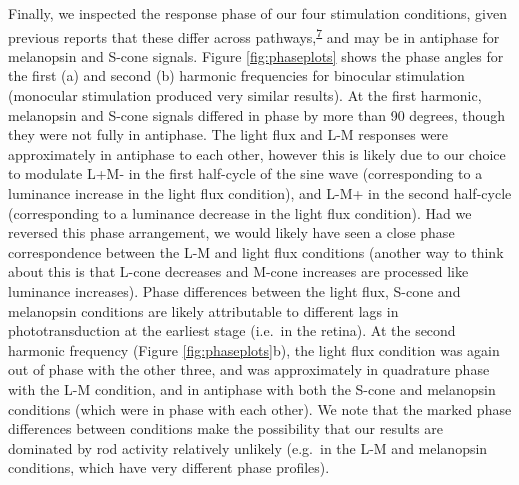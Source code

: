 \documentclass[
]{article}
\begin{document}
Finally, we inspected the response phase of our four stimulation conditions, given previous reports that these differ across pathways,\textsuperscript{\protect\hyperlink{ref-Spitschan2014}{7}} and may be in antiphase for melanopsin and S-cone signals. Figure \ref{fig:phaseplots} shows the phase angles for the first (a) and second (b) harmonic frequencies for binocular stimulation (monocular stimulation produced very similar results). At the first harmonic, melanopsin and S-cone signals differed in phase by more than 90 degrees, though they were not fully in antiphase. The light flux and L-M responses were approximately in antiphase to each other, however this is likely due to our choice to modulate L+M- in the first half-cycle of the sine wave (corresponding to a luminance increase in the light flux condition), and L-M+ in the second half-cycle (corresponding to a luminance decrease in the light flux condition). Had we reversed this phase arrangement, we would likely have seen a close phase correspondence between the L-M and light flux conditions (another way to think about this is that L-cone decreases and M-cone increases are processed like luminance increases). Phase differences between the light flux, S-cone and melanopsin conditions are likely attributable to different lags in phototransduction at the earliest stage (i.e.~in the retina). At the second harmonic frequency (Figure \ref{fig:phaseplots}b), the light flux condition was again out of phase with the other three, and was approximately in quadrature phase with the L-M condition, and in antiphase with both the S-cone and melanopsin conditions (which were in phase with each other). We note that the marked phase differences between conditions make the possibility that our results are dominated by rod activity relatively unlikely (e.g.~in the L-M and melanopsin conditions, which have very different phase profiles).
\end{document}
